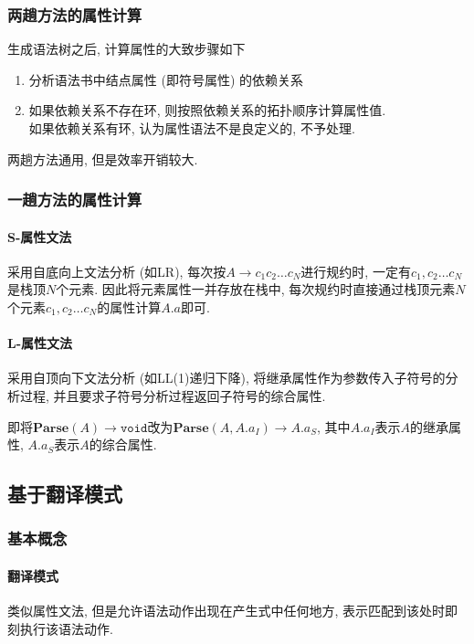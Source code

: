 \documentclass{ctexart}
\begin{document}
\subsubsection{两趟方法的属性计算}
    生成语法树之后, 计算属性的大致步骤如下
    \begin{enumerate}
        \item 分析语法书中结点属性 (即符号属性) 的依赖关系
        \item 如果依赖关系不存在环, 则按照依赖关系的拓扑顺序计算属性值.\\
        如果依赖关系有环, 认为属性语法不是良定义的, 不予处理.\par
    \end{enumerate}
    两趟方法通用, 但是效率开销较大.

\subsubsection{一趟方法的属性计算}
\paragraph{S-属性文法} 采用自底向上文法分析 (如LR), 每次按$A \to c_1 c_2 \ldots c_N$进行规约时, 一定有$c_1, c_2 \ldots c_N$是栈顶$N$个元素. 
    因此将元素属性一并存放在栈中, 每次规约时直接通过栈顶元素$N$个元素$c_1, c_2\ldots c_N$的属性计算$A.a$即可.
\paragraph{L-属性文法} \label{onepass-l-attr-grammar} 采用自顶向下文法分析 (如LL(1)递归下降),
    将继承属性作为参数传入子符号的分析过程, 并且要求子符号分析过程返回子符号的综合属性.\par
    即将$\mathbf{Parse}(A) \to \mathtt{void}$改为$\mathbf{Parse}(A, A.a_I) \to A.a_S$, 其中$A.a_I$表示$A$的继承属性, $A.a_S$表示$A$的综合属性.

\subsection{基于翻译模式}
\subsubsection{基本概念}
\paragraph{翻译模式} 类似属性文法, 但是允许语法动作出现在产生式中任何地方, 表示匹配到该处时即刻执行该语法动作.
\end{document}
